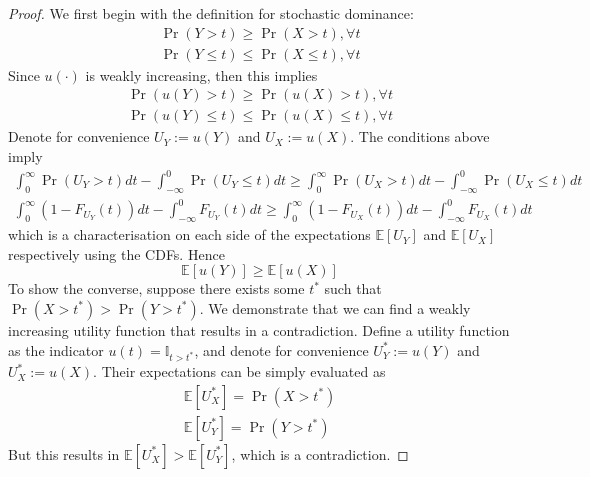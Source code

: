 \documentclass[11pt]{report} %
\begin{document}
\begin{proof}
We first begin with the definition for stochastic dominance:
\begin{gather}
\operatorname{Pr}\left(Y > t\right) \geq \operatorname{Pr}\left(X > t\right), \forall t \\
\operatorname{Pr}\left(Y \leq t\right) \leq \operatorname{Pr}\left(X \leq t\right), \forall t 
\end{gather}
Since $u\left(\cdot\right)$ is weakly increasing, then this implies
\begin{gather}
\operatorname{Pr}\left(u\left(Y\right) > t\right) \geq \operatorname{Pr}\left(u\left(X\right) > t\right), \forall t \\
\operatorname{Pr}\left(u\left(Y\right) \leq t\right) \leq \operatorname{Pr}\left(u\left(X\right) \leq t\right), \forall t 
\end{gather}
Denote for convenience $U_{Y} := u\left(Y\right)$ and $U_{X} := u\left(X\right)$. The conditions above imply
\begin{gather}
\int_{0}^{\infty}\operatorname{Pr}\left(U_{Y} > t\right)dt - \int_{-\infty}^{0}\operatorname{Pr}\left(U_{Y} \leq t\right)dt \geq \int_{0}^{\infty}\operatorname{Pr}\left(U_{X} > t\right)dt - \int_{-\infty}^{0}\operatorname{Pr}\left(U_{X} \leq t\right)dt \\
\int_{0}^{\infty}\left(1 - F_{U_{Y}}\left(t\right)\right)dt - \int_{-\infty}^{0}F_{U_{Y}}\left(t\right)dt \geq \int_{0}^{\infty}\left(1 - F_{U_{X}}\left(t\right)\right)dt - \int_{-\infty}^{0}F_{U_{X}}\left(t\right)dt
\end{gather}
which is a characterisation on each side of the expectations $\mathbb{E}\left[U_{Y}\right]$ and $\mathbb{E}\left[U_{X}\right]$ respectively using the CDFs. Hence
\begin{equation}
\mathbb{E}\left[u\left(Y\right)\right] \geq \mathbb{E}\left[u\left(X\right)\right]
\end{equation}
To show the converse, suppose there exists some $t^{*}$ such that $\operatorname{Pr}\left(X > t^{*}\right) > \operatorname{Pr}\left(Y > t^{*}\right)$. We demonstrate that we can find a weakly increasing utility function that results in a contradiction. Define a utility function as the indicator $u\left(t\right) = \mathbb{I}_{t > t^{*}}$, and denote for convenience $U_{Y}^{*} := u\left(Y\right)$ and $U_{X}^{*} := u\left(X\right)$. Their expectations can be simply evaluated as
\begin{gather}
\mathbb{E}\left[U_{X}^{*}\right] = \operatorname{Pr}\left(X > t^{*}\right) \\
\mathbb{E}\left[U_{Y}^{*}\right] = \operatorname{Pr}\left(Y > t^{*}\right)
\end{gather}
But this results in $\mathbb{E}\left[U_{X}^{*}\right] > \mathbb{E}\left[U_{Y}^{*}\right]$, which is a contradiction.
\end{proof}
\end{document}
